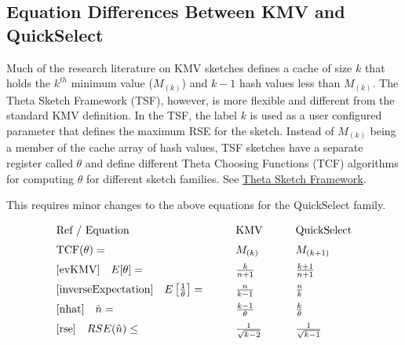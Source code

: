 \subsection{Equation Differences Between KMV and QuickSelect}
Much of the research literature on KMV sketches defines a cache of size $k$ that holds the $k^{th}$ minimum value ($M_{(k)}$) and $k-1$ hash values less than $M_{(k)}$.  
The Theta Sketch Framework (TSF), however, is more flexible and different from the standard KMV definition.
In the TSF, the label $k$ is used as a user configured parameter that defines the maximum RSE for the sketch. 
Instead of $M_{(k)}$ being a member of the cache array of hash values, 
TSF sketches have a separate register called $\theta$ and define different Theta Choosing Functions (TCF) algorithms for computing $\theta$ for different sketch families. 
See \href{http://datasketches.github.io/docs/ThetaSketchFramework.pdf}{Theta Sketch Framework}.

This requires minor changes to the above equations for the QuickSelect family.
\begin{equation*}
\arraycolsep=15pt
\renewcommand\arraystretch{1.5}
\begin{array}{lll}
\text{Ref / Equation}                                           & \text{KMV}                       & \text{QuickSelect}\\
\text{TCF}(\theta) =                                            & M_{(k)}                             & M_{(k+1)}\\
\ref{evKMV} \quad E[\theta] =                            & \frac{k}{n+1}                     & \frac{k+1}{n+1}\\ 
\ref{inverseExpectation} \quad E\left[\frac{1}{\theta}\right] = & \frac{n}{k-1}   & \frac{n}{k}\\
\ref{nhat} \quad \hat{n} =                                    & \frac{k-1}{\theta}               & \frac{k}{\theta}\\
\ref{rse}  \quad RSE(\hat{n})\leq                         & \frac{1}{\sqrt{k-2}}            & \frac{1}{\sqrt{k-1}}\\
\end{array}
\end{equation*}
